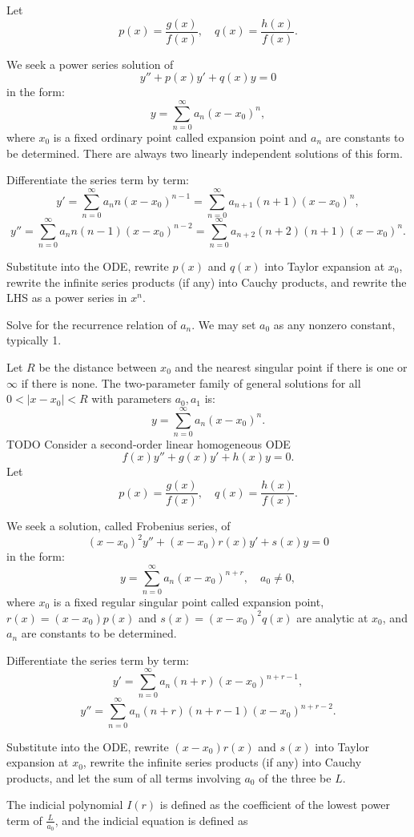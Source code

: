 \documentclass[a4paper,12pt]{report}
\begin{document}
Let
\[p(x)=\frac{g(x)}{f(x)},\quad q(x)=\frac{h(x)}{f(x)}.\]
\ben
\item We seek a power series solution of
\[y''+p(x)y'+q(x)y=0\]
in the form:
\[y=\sum_{n=0}^{\infty}a_n(x-x_0)^n,\]
where $x_0$ is a fixed ordinary point called expansion point and $a_n$ are constants to be determined. There are always two linearly independent solutions of this form.
\item Differentiate the series term by term:
\[y'=\sum_{n=0}^{\infty}a_nn(x-x_0)^{n-1}=\sum_{n=0}^{\infty}a_{n+1}(n+1)(x-x_0)^n,\]
\[y''=\sum_{n=0}^{\infty}a_nn(n-1)(x-x_0)^{n-2}=\sum_{n=0}^{\infty}a_{n+2}(n+2)(n+1)(x-x_0)^n.\]
\item Substitute into the ODE, rewrite $p(x)$ and $q(x)$ into Taylor expansion at $x_0$, rewrite the infinite series products (if any) into Cauchy products, and rewrite the LHS as a power series in $x^n$.
\item Solve for the recurrence relation of $a_n$. We may set $a_0$ as any nonzero constant, typically 1.
\item Let $R$ be the distance between $x_0$ and the nearest singular point if there is one or $\infty$ if there is none. The two-parameter family of general solutions for all $0<|x-x_0|<R$ with parameters $a_0,a_1$ is:
\[y=\sum_{n=0}^{\infty}a_n(x-x_0)^n.\]
\een
\bpr
TODO
\epr
{}
Consider a second-order linear homogeneous ODE
\[f(x)y''+g(x)y'+h(x)y=0.\]
Let
\[p(x)=\frac{g(x)}{f(x)},\quad q(x)=\frac{h(x)}{f(x)}.\]
\ben
\item We seek a solution, called Frobenius series, of
\[(x-x_0)^2y''+(x-x_0)r(x)y'+s(x)y=0\]
in the form:
\[y=\sum_{n=0}^{\infty}a_n(x-x_0)^{n+r},\quad a_0\neq 0,\]
where $x_0$ is a fixed regular singular point called expansion point, $r(x)=(x-x_0)p(x)$ and $s(x)=(x-x_0)^2q(x)$ are analytic at $x_0$, and $a_n$ are constants to be determined.
\item Differentiate the series term by term:
\[y'=\sum_{n=0}^{\infty}a_n(n+r)(x-x_0)^{n+r-1},\]
\[y''=\sum_{n=0}^{\infty}a_n(n+r)(n+r-1)(x-x_0)^{n+r-2}.\]
\item Substitute into the ODE, rewrite $(x-x_0)r(x)$ and $s(x)$ into Taylor expansion at $x_0$, rewrite the infinite series products (if any) into Cauchy products, and let the sum of all terms involving $a_0$ of the three be $L$.
\item The indicial polynomial $I(r)$ is defined as the coefficient of the lowest power term of $\frac{L}{a_0}$, and the indicial equation is defined as
\end{document}
